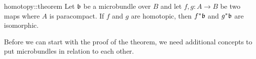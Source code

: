 \begin{mytheorem}{homotopy::theorem}
    Let $\mathfrak{b}$ be a microbundle over $B$ and let $f, g: A \to B$ be two maps where $A$ is paracompact.
    If $f$ and $g$ are homotopic, then $f^*\mathfrak{b}$ and $g^*\mathfrak{b}$ are isomorphic.
\end{mytheorem}

\begin{myparagraph}
    Before we can start with the proof of the theorem,
    we need additional concepts to put microbundles in relation to each other.
\end{myparagraph}